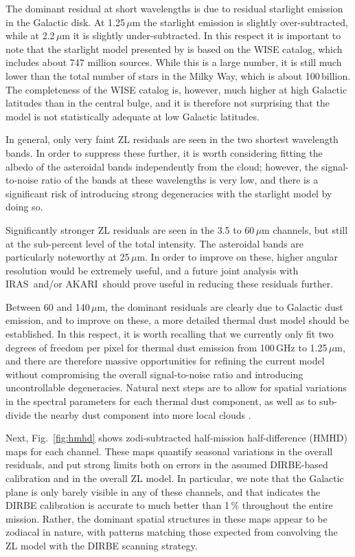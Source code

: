 \documentclass{aa}
\def\AKARI{\textrm{{AKARI}}}
\def\IRAS{\textrm{{IRAS}}}
\begin{document}
The dominant residual at short wavelengths is due to
residual starlight emission in the Galactic disk. At 1.25$\,\mu$m the starlight emission is
slightly over-subtracted, while at 2.2\,$\mu$m it is slightly
under-subtracted. In this respect it is important to note that the
starlight model presented by \citet{CG02_04} is based on the WISE
catalog, which includes about 747 million sources. While this is a
large number, it is still much lower than the total number of stars in
the Milky Way, which is about 100\,billion. The completeness of the
WISE catalog is, however, much higher at high Galactic latitudes than
in the central bulge, and it is therefore not surprising that the
model is not statistically adequate at low Galactic latitudes. 
       
In general, only very faint ZL residuals are seen in the two
shortest wavelength bands. In order to suppress these further, it is
worth considering fitting the albedo of the asteroidal bands
independently from the cloud; however, the signal-to-noise ratio of
the bands at these wavelengths is very low, and there is a significant
risk of introducing strong degeneracies with the starlight model by
doing so.

Significantly stronger ZL residuals are seen in the 3.5 to 60$\,\mu$m
channels, but still at the sub-percent level of the total
intensity. The asteroidal bands are particularly noteworthy at
25$\,\mu$m. In order to improve on these, higher angular resolution
would be extremely useful, and a future joint analysis with \IRAS\
and/or \AKARI\ should prove useful in reducing these residuals further.

Between 60 and 140$\,\mu$m, the dominant residuals are clearly due to
Galactic dust emission, and to improve on these, a more detailed
thermal dust model should be established. In this respect, it is
worth recalling that we currently only fit two degrees of freedom per
pixel for thermal dust emission from 100\,GHz to 1.25$\,\mu$m, and
there are therefore massive opportunities for refining the current
model without compromising the overall signal-to-noise ratio and
introducing uncontrollable degeneracies. Natural next steps are to
allow for spatial variations in the spectral parameters for each
thermal dust component, as well as to sub-divide the nearby dust
component into more local clouds \citep{CG02_05}.

Next, Fig.~\ref{fig:hmhd} shows zodi-subtracted half-mission half-difference (HMHD)
maps for each channel. These maps quantify seasonal variations in the
overall residuals, and put strong limits both on errors in the assumed
DIRBE-based calibration and in the overall ZL model. In particular, we
note that the Galactic plane is only barely visible in any of these
channels, and that indicates the DIRBE calibration is accurate to much
better than 1\,\% throughout the entire mission. Rather, the dominant
spatial structures in these maps appear to be zodiacal in nature, with
patterns matching those expected from convolving the ZL model with the
DIRBE scanning strategy.
\end{document}
